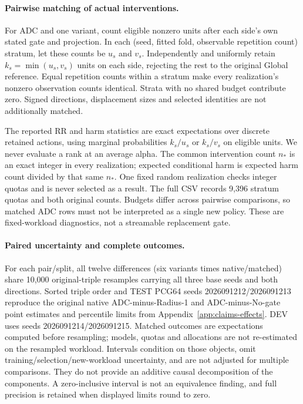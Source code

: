 \documentclass[11pt,a4paper]{article}
\begin{document}
\paragraph{Pairwise matching of actual interventions.}
For ADC and one variant, count eligible nonzero units after each side's own stated gate and projection. In each (seed, fitted fold, observable repetition count) stratum, let these counts be $u_s$ and $v_s$. Independently and uniformly retain $k_s=\min(u_s,v_s)$ units on each side, rejecting the rest to the original Global reference. Equal repetition counts within a stratum make every realization's nonzero observation counts identical. Strata with no shared budget contribute zero. Signed directions, displacement sizes and selected identities are not additionally matched.

The reported RR and harm statistics are exact expectations over discrete retained actions, using marginal probabilities $k_s/u_s$ or $k_s/v_s$ on eligible units. We never evaluate a rank at an average alpha. The common intervention count $n_*$ is an exact integer in every realization; expected conditional harm is expected harm count divided by that same $n_*$. One fixed random realization checks integer quotas and is never selected as a result. The full CSV records 9,396 stratum quotas and both original counts. Budgets differ across pairwise comparisons, so matched ADC rows must not be interpreted as a single new policy. These are fixed-workload diagnostics, not a streamable replacement gate.

\paragraph{Paired uncertainty and complete outcomes.}
For each pair/split, all twelve differences (six variants times native/matched) share 10,000 original-triple resamples carrying all three base seeds and both directions. Sorted triple order and TEST PCG64 seeds 2026091212/2026091213 reproduce the original native ADC-minus-Radius-1 and ADC-minus-No-gate point estimates and percentile limits from Appendix~\ref{app:claims-effects}. DEV uses seeds 2026091214/2026091215. Matched outcomes are expectations computed before resampling; models, quotas and allocations are not re-estimated on the resampled workload. Intervals condition on those objects, omit training/selection/new-workload uncertainty, and are not adjusted for multiple comparisons. They do not provide an additive causal decomposition of the components. A zero-inclusive interval is not an equivalence finding, and full precision is retained when displayed limits round to zero.
\end{document}
